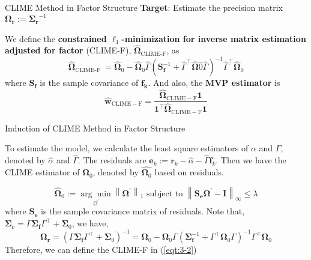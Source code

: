 \documentclass{beamer}
\begin{document}
\begin{frame}{CLIME Method in Factor Structure}
\textbf{Target}: Estimate the precision matrix $\bm{\Omega_r}:= \bm{\Sigma_r}^{-1}$\newline


We define the \textbf{constrained $\ell_1$-minimization for inverse matrix estimation adjusted for factor} (CLIME-F), $\hat{\bm{\Omega}}_{\text{CLIME-F}}$, as
\begin{equation}
\label{eqt:3-2}
\widehat{\boldsymbol{\Omega}}_{\text {CLIME-F }}=\widehat{\boldsymbol{\Omega}}_0-\widehat{\boldsymbol{\Omega}}_0 \widehat{\Gamma}\left(\mathbf{S}_{\mathbf{f}}^{-1}+\widehat{\Gamma}^{\top} \widehat{\boldsymbol{\Omega}} \widehat{0} \widehat{\Gamma}\right)^{-1} \widehat{\Gamma}^{\top} \widehat{\boldsymbol{\Omega}}_0
\end{equation}
where $\bm{S_f}$ is the sample covariance of $\bm{f_k}$. And also, the \textbf{MVP estimator} is 
\begin{equation}
\label{eqt:3-3}
\widehat{\boldsymbol{w}}_{\mathrm{CLIME}-\mathrm{F}}=\frac{\widehat{\boldsymbol{\Omega}}_{\mathrm{CLIME}-\mathrm{F}} \mathbf{1}}{\mathbf{1}^{\top} \widehat{\boldsymbol{\Omega}}_{\mathrm{CLIME}-\mathrm{F}} \mathbf{1}}
\end{equation}
\end{frame}

\begin{frame}{Induction of CLIME Method in Factor Structure}

To estimate the model, we calculate the least square estimators of $\alpha$ and $\Gamma$, denoted by $\hat{\alpha}$ and $\hat{\Gamma}$. The residuals are $\bm{e}_k := \bm{r}_k-\hat{\alpha}-\hat{\Gamma}\bm{f}_k$. Then we have the CLIME estimator of $\bm{\Omega}_0$, denoted by $\hat{\bm{\Omega}_0}$ based on residuals.

\begin{equation}
\label{eqt:3-4}
\widehat{\boldsymbol{\Omega}}_0:=\underset{\Omega^{\prime}}{\arg \min }\left\|\boldsymbol{\Omega}^{\prime}\right\|_1 \text { subject to }\left\|\mathbf{S}_{\mathbf{e}} \boldsymbol{\Omega}^{\prime}-\mathbf{I}\right\|_{\infty} \leq \lambda
\end{equation}
where $\bm{S_e}$ is the sample covariance matrix of residuals. Note that, $\boldsymbol{\Sigma}_{\mathbf{r}}=\Gamma \boldsymbol{\Sigma}_{\mathbf{f}} \Gamma^{\top}+\boldsymbol{\Sigma}_0$, we have,
\begin{equation}
\label{eqt:3-5}
\boldsymbol{\Omega}_{\mathbf{r}}=\left(\Gamma \boldsymbol{\Sigma}_{\mathbf{f}} \Gamma^{\top}+\boldsymbol{\Sigma}_0\right)^{-1}=\boldsymbol{\Omega}_0-\boldsymbol{\Omega}_0 \Gamma\left(\boldsymbol{\Sigma}_{\mathbf{f}}^{-1}+\Gamma^{\top} \boldsymbol{\Omega}_0 \Gamma\right)^{-1} \Gamma^{\top} \boldsymbol{\Omega}_0
\end{equation}
Therefore, we can define the CLIME-F in (\ref{eqt:3-2})

\end{frame}
\end{document}
